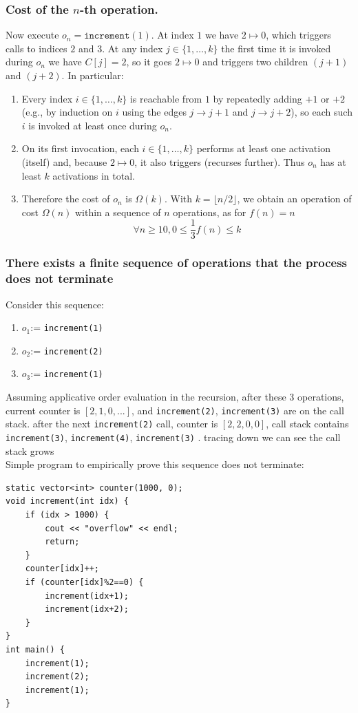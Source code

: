 \documentclass[9pt]{extarticle}
\begin{document}
\subsubsection{Cost of the $n$-th operation.}
Now execute $o_n=\texttt{increment}(1)$. At index $1$ we have $2\mapsto 0$,
which {triggers} calls to indices $2$ and $3$. At any index $j\in\{1,\dots,k\}$
the first time it is invoked during $o_n$ we have $C[j]=2$, so it goes $2\mapsto 0$
and {triggers} two children $(j+1)$ and $(j+2)$. In particular:
\begin{enumerate}
    \item Every index $i\in\{1,\dots,k\}$ is reachable from $1$ by repeatedly adding
    $+1$ or $+2$ (e.g., by induction on $i$ using the edges $j\to j+1$ and $j\to j+2$),
    so each such $i$ is {invoked at least once} during $o_n$.
    \item On its {first} invocation, each $i\in\{1,\dots,k\}$ performs at least one
    activation (itself) and, because $2\mapsto 0$, it also {triggers}
    (recurses further). Thus $o_n$ has at least $k$ activations in total.
    \item Therefore the cost of $o_n$ is $\Omega(k)$. With $k=\lfloor n/2\rfloor$, we
    obtain an operation of cost $\Omega(n)$ within a sequence of $n$ operations, as for $f(n) = n$
    \[\forall n \geq 10, 0 \leq \frac{1}{3} f(n) \leq k\]
\end{enumerate}
\subsubsection{There exists a finite sequence of operations that the process does not terminate}
Consider this sequence:
\begin{enumerate}
    \item $o_1$:= \texttt{increment(1)}
    \item $o_2$:= \texttt{increment(2)}
    \item $o_3$:= \texttt{increment(1)}
\end{enumerate}
Assuming applicative order evaluation in the recursion, after these 3 operations, current counter is $[2, 1, 0, ...]$, and \texttt{increment(2)}, \texttt{increment(3)}
are on the call stack. after the next \texttt{increment(2)} call, counter is $[2, 2, 0, 0]$, call stack contains \texttt{increment(3)}, \texttt{increment(4)}, \texttt{increment(3)}
. tracing down we can see the call stack grows\\
Simple program to empirically prove this sequence does not terminate:
\begin{lstlisting}
static vector<int> counter(1000, 0);
void increment(int idx) {
    if (idx > 1000) {
        cout << "overflow" << endl;
        return;
    }
    counter[idx]++;
    if (counter[idx]%2==0) {
        increment(idx+1);
        increment(idx+2);
    }
}
int main() {
    increment(1);
    increment(2);
    increment(1);
}
\end{lstlisting}
\newpage
\end{document}
